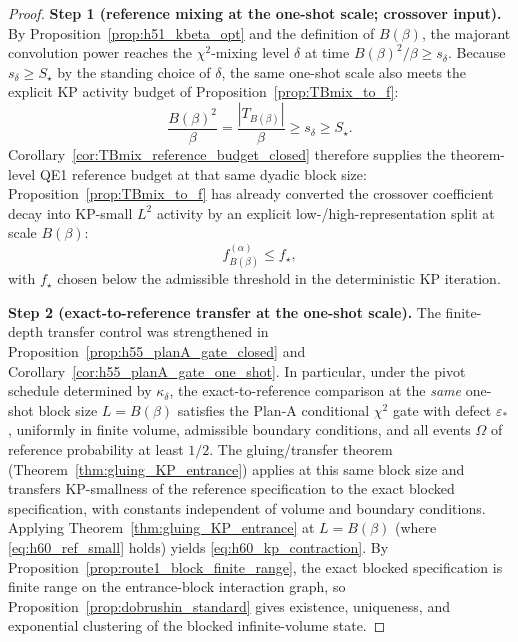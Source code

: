 \begin{proof}
\noindent\textbf{Step 1 (reference mixing at the one-shot scale; crossover input).}
By Proposition~\ref{prop:h51_kbeta_opt} and the definition of $B(\beta)$,
the majorant convolution power reaches the $\chi^2$-mixing level $\delta$ at time $B(\beta)^2/\beta\ge s_{\delta}$.
Because $s_{\delta}\ge S_\star$ by the standing choice of $\delta$, the same one-shot scale also meets the explicit KP activity budget of Proposition~\ref{prop:TBmix_to_f}:
\[
\frac{B(\beta)^2}{\beta}=\frac{|T_{B(\beta)}|}{\beta}\ge s_{\delta}\ge S_\star.
\]
Corollary~\ref{cor:TBmix_reference_budget_closed} therefore supplies the theorem-level QE1 reference budget at that same dyadic block size: Proposition~\ref{prop:TBmix_to_f} has already converted the crossover coefficient decay into KP-small $L^2$ activity by an explicit low-/high-representation split at scale $B(\beta)$:
\begin{equation}
\label{eq:h60_ref_small}
f_{B(\beta)}^{(\alpha)}\le f_{\star},
\end{equation}
with $f_{\star}$ chosen below the admissible threshold in the deterministic KP iteration.

\medskip
\noindent\textbf{Step 2 (exact-to-reference transfer at the one-shot scale).}
The finite-depth transfer control was strengthened in Proposition~\ref{prop:h55_planA_gate_closed} and Corollary~\ref{cor:h55_planA_gate_one_shot}.
In particular, under the pivot schedule determined by $\kappa_{\delta}$, the exact-to-reference comparison at the \emph{same} one-shot block size $L=B(\beta)$ satisfies the Plan-A conditional $\chi^2$ gate with defect $\varepsilon_\ast$, uniformly in finite volume, admissible boundary conditions, and all events $\Omega$ of reference probability at least $1/2$.
The gluing/transfer theorem (Theorem~\ref{thm:gluing_KP_entrance}) applies at this same block size and transfers KP-smallness of the reference specification to the exact blocked specification,
with constants independent of volume and boundary conditions.
Applying Theorem~\ref{thm:gluing_KP_entrance} at $L=B(\beta)$ (where \eqref{eq:h60_ref_small} holds) yields
\eqref{eq:h60_kp_contraction}.
By Proposition~\ref{prop:route1_block_finite_range}, the exact blocked specification is finite range on the entrance-block interaction graph, so Proposition~\ref{prop:dobrushin_standard} gives existence, uniqueness, and exponential clustering of the blocked infinite-volume state.
\end{proof}


